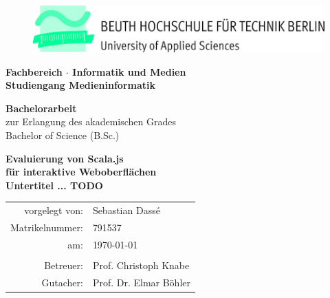 \begin{titlepage}
\begin{center}
	\begin{figure}[!h]
		\includegraphics[scale=1]{./title/Beuth_Logo_horizontal.jpg}
	\end{figure}

	\vspace{15mm}

	\large
		\textbf{Fachbereich  $\cdot$ Informatik und Medien\\[3mm]
		Studiengang Medieninformatik}\\

	\vspace{15mm}

	\Large
		\textbf{Bachelorarbeit}\\[5mm]
	\normalsize
		zur Erlangung des akademischen Grades\\
		Bachelor of Science (B.Sc.)\\

	\vspace{15mm}

	\huge
		\textbf{Evaluierung von Scala.js \\
		für interaktive Weboberflächen }\\ [0,5cm]
	
	\Large
		\textbf{Untertitel ... TODO}\\[2cm]

	\normalsize
	\begin{tabular}{rl}
		vorgelegt von: & Sebastian Dassé \\
		Matrikelnummer: & 791537 \\
		am: & \today \\
		& \\
		Betreuer: & Prof. Christoph Knabe\\
		Gutacher: & Prof. Dr. Elmar Böhler\\
	\end{tabular}\\
\end{center}
\end{titlepage}